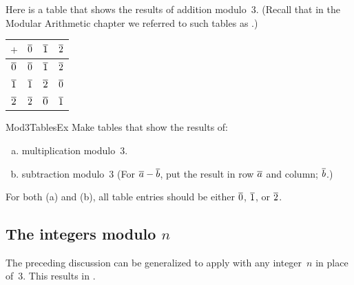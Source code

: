\begin{eg}
Here is a table that shows the results of addition modulo~$3$. (Recall that in the Modular Arithmetic chapter we referred to such tables as .)
\begin{center} \begin{tabular}{c|c c c}
$+$&$\overline{0}$&$\overline{1}$&$\overline{2}$\\ \hline
$\overline{0}$&$\overline{0}$&$\overline{1}$&$\overline{2}$ \\
$\overline{1}$&$\overline{1}$&$\overline{2}$&$\overline{0}$ \\
$\overline{2}$&$\overline{2}$&$\overline{0}$&$\overline{1}$ \\
\end{tabular}
\end{center}
\end{eg}


\begin{exercise}{Mod3TablesEx}
Make tables that show the results of:
\begin{enumerate}[(a)]
\item \label{Mod3TablesEx-multiplication}
multiplication modulo~$3$.
\item \label{Mod3TablesEx-subtraction}
subtraction modulo~$3$ (For $\overline{a} - \overline{b}$,  put the result in row $\overline{a}$ and column; $\overline{b}$.)
\end{enumerate}
For both (a) and (b), all table entries should be  either $\overline{0}$, $\overline{1}$, or $\overline{2}$.
\end{exercise}



\subsection{The integers modulo $n$}
\label{subsec:EquivalenceRelations:ModularArithmetic:Modn}

The preceding discussion can be generalized to apply with any integer~$n$ in place of~$3$. This results in .

